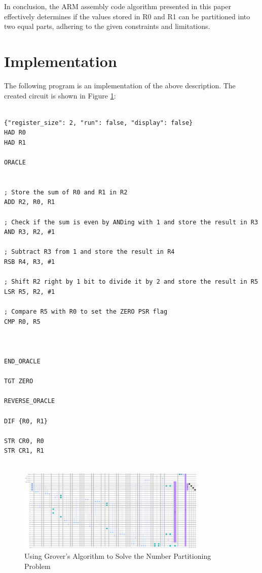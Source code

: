 In conclusion, the ARM assembly code algorithm presented in this paper effectively determines if the values stored in R0 and R1 can be partitioned into two equal parts, adhering to the given constraints and limitations.



\section{Implementation}

The following program is an implementation of the above description. The created circuit is shown in Figure \ref{fig:Number_Partitioning}:

\begin{lstlisting}

{"register_size": 2, "run": false, "display": false}
HAD R0
HAD R1

ORACLE


; Store the sum of R0 and R1 in R2
ADD R2, R0, R1

; Check if the sum is even by ANDing with 1 and store the result in R3
AND R3, R2, #1

; Subtract R3 from 1 and store the result in R4
RSB R4, R3, #1

; Shift R2 right by 1 bit to divide it by 2 and store the result in R5
LSR R5, R2, #1

; Compare R5 with R0 to set the ZERO PSR flag
CMP R0, R5



END_ORACLE

TGT ZERO

REVERSE_ORACLE

DIF {R0, R1}

STR CR0, R0
STR CR1, R1


\end{lstlisting}

\begin{figure}[htp]
    \centering
    \includegraphics[width=9cm]{Figures/Number_Partitioning_circuit.png}
    \caption{Using Grover's Algorithm to Solve the Number Partitioning Problem}
    \label{fig:Number_Partitioning}
\end{figure}

